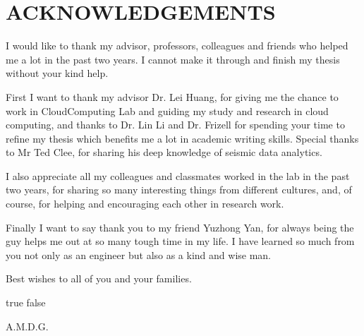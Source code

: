 %
%
%


\chapter*{ACKNOWLEDGEMENTS}

I would like to thank my advisor, professors, colleagues and friends who helped me a lot in the past two years. I cannot make it through and finish my thesis without your kind help.

First I want to thank my advisor Dr. Lei Huang, for giving me the chance to work in CloudComputing Lab and guiding my study and research in cloud computing, and thanks to Dr. Lin Li and Dr. Frizell for spending your time to refine my thesis which benefits me a lot in academic writing skills. Special thanks to Mr Ted Clee, for sharing his deep knowledge of seismic data analytics.

I also appreciate all my colleagues and classmates worked in the lab in the past two years, for sharing so many interesting things from different cultures, and, of course, for helping and encouraging each other in research work.

Finally I want to say thank you to my friend Yuzhong Yan, for always being the guy helps me out at so many tough time in my life. I have learned so much from you not only as an engineer but also as a kind and wise man. 

Best wishes to all of you and your families.

\pagebreak{}

\ifx true false
\vspace*{\fill}
\begin{center}
A.M.D.G.
\end{center}
\vspace*{\fill}
\pagebreak{}
\fi
